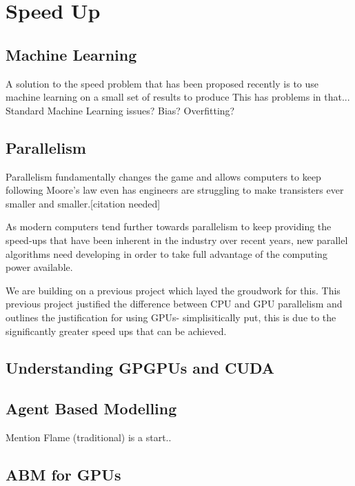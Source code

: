 \documentclass{UoYCSproject}
\begin{document}
\section{Speed Up}
\subsection{Machine Learning}
A solution to the speed problem that has been proposed recently is to use machine learning on a small set of results to produce 
This has problems in that...
Standard Machine Learning issues? Bias? Overfitting?


\subsection{Parallelism}
Parallelism fundamentally changes the game and allows computers to keep following Moore's law even has engineers are struggling to make transisters ever smaller and smaller.[citation needed]

As modern computers tend further towards parallelism to keep providing the speed-ups that have been inherent in the industry over recent years, new parallel algorithms need developing in order to take full advantage of the computing power available. 

We are building on a previous project\cite{phil_diss} which layed the groudwork for this.
This previous project justified the difference between CPU and GPU parallelism and outlines the justification for using GPUs- simplisitically put, this is due to the significantly greater speed ups that can be achieved.


\subsection{Understanding GPGPUs and CUDA}


\subsection{Agent Based Modelling}
Mention Flame (traditional) is a start..

\subsection{ABM for GPUs}
\end{document}
